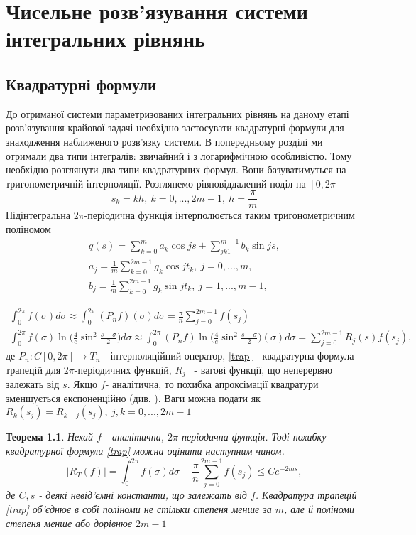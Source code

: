 \documentclass[12pt]{report}
\newtheorem{theorem}{Теорема}
\begin{document}
 
 \newpage
 
 \chapter{Чисельне розв'язування системи інтегральних рівнянь}
 \section{Квадратурні формули} \label{quad}

До отриманої системи параметризованих інтегральних рівнянь на даному етапі розв'язування крайової задачі необхідно застосувати квадратурні формули для знаходження наближеного розв'язку системи. В попередньому розділі ми отримали два типи інтегралів: звичайний і з логарифмічною особливістю. Тому необхідно розглянути два типи квадратурних формул. Вони базуватимуться на тригонометричній інтерполяції.
Розглянемо рівновіддалений поділ на $[0, 2\pi]$ 
$$
	s_k=kh, \ k=0,...,2m-1, \ h=\frac{\pi}{m}
$$
Підінтегральна $2\pi$-періодична функція інтерполюється таким тригонометричним поліномом
\begin{gather*}
	q(s)=\sum_{k=0}^{m} a_k\cos js+ \sum_{jk1}^{m-1}b_k\sin js, \\
	a_j=\frac{1}{m}\sum_{k=0}^{2m-1}g_k\cos jt_k, \ j=0,...,m, \\
	b_j=\frac{1}{m}\sum_{k=0}^{2m-1}g_k\sin jt_k, \ j=1,...,m-1,
\end{gather*}

\begin{gather}
	\int_{0}^{2\pi}f(\sigma)d\sigma\approx\int_{0}^{2\pi}(P_nf)(\sigma)d\sigma=\frac{\pi}{n}\sum_{j=0}^{2m-1}f(s_j) \label{trap} \\
	\int_{0}^{2\pi}f(\sigma)\ln\Big(\frac{4}{e}\sin^2\frac{s-\sigma}{2}\Big)d\sigma\approx\int_{0}^{2\pi}(P_nf)\ln\Big(\frac{4}{e}\sin^2\frac{s-\sigma}{2}\Big)(\sigma)d\sigma=\sum_{j=0}^{2m-1}R_j(s)f(s_j),
\end{gather}
де $P_n:C[0,2\pi]\to T_n$ - інтерполяційний оператор, 
\eqref{trap} - квадратурна формула трапецій для $2\pi$-періодичних функцій, $R_j$ \ - вагові функції, що неперервно залежать від $s$.
Якщо $f$- аналітична, то похибка апроксімації квадратури зменшується експоненційно (див. \cite{kress}). Ваги можна подати як $R_k(s_j)=R_{k-j}(s_j), \ j,k=0,...,2m-1$

\begin{theorem}
	Нехай $f$ - аналітична, $2\pi$-періодична функція. Тоді похибку квадратурної формули \eqref{trap} можна оцінити наступним чином.
	\begin{equation}
		|R_T(f)|=\int_{0}^{2\pi}f(\sigma)d\sigma-\frac{\pi}{n}\sum_{j=0}^{2m-1}f(s_j)\leq C e^{-2ms},
	\end{equation}
	де $C, s$ - деякі невід'ємні константи, що залежать від $f$. Квадратура трапецій \eqref{trap} об'єднює в собі поліноми не стільки степеня менше за $m$, але й поліноми степеня менше або дорівнює $2m-1$
\end{theorem}
\end{document}
